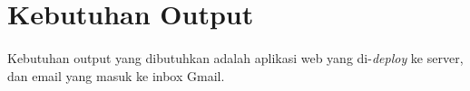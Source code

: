 \documentclass[./bab_3.tex]{subfiles}
\begin{document}
\section{Kebutuhan Output}
\paragraph{}Kebutuhan output yang dibutuhkan adalah aplikasi
web yang di-\textit{deploy} ke server, dan email yang masuk
ke inbox Gmail.
\end{document}
